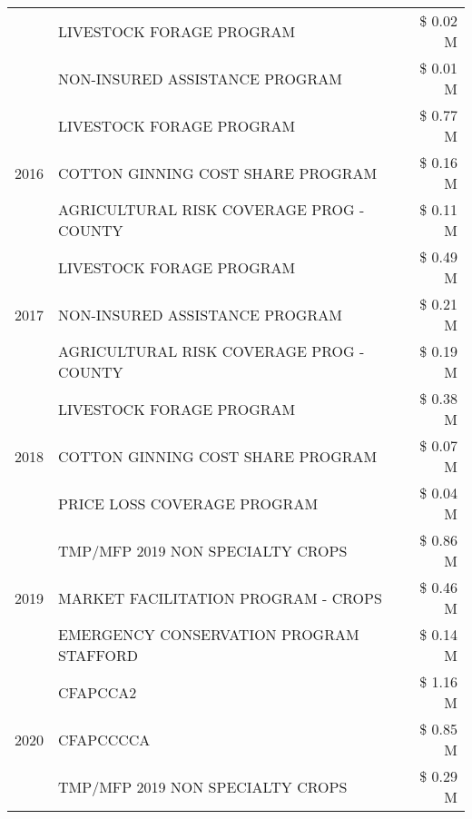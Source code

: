 \begin{tabular}{llr}
 & LIVESTOCK FORAGE PROGRAM & \$ 0.02 M \\
 & NON-INSURED ASSISTANCE PROGRAM & \$ 0.01 M \\
\cline{1-3}
\multirow[t]{3}{*}{2016} & LIVESTOCK FORAGE PROGRAM                      & \$ 0.77 M \\
 & COTTON GINNING COST SHARE PROGRAM             & \$ 0.16 M \\
 & AGRICULTURAL RISK COVERAGE PROG - COUNTY      & \$ 0.11 M \\
\cline{1-3}
\multirow[t]{3}{*}{2017} & LIVESTOCK FORAGE PROGRAM & \$ 0.49 M \\
 & NON-INSURED ASSISTANCE PROGRAM & \$ 0.21 M \\
 & AGRICULTURAL RISK COVERAGE PROG - COUNTY & \$ 0.19 M \\
\cline{1-3}
\multirow[t]{3}{*}{2018} & LIVESTOCK FORAGE PROGRAM & \$ 0.38 M \\
 & COTTON GINNING COST SHARE PROGRAM & \$ 0.07 M \\
 & PRICE LOSS COVERAGE PROGRAM & \$ 0.04 M \\
\cline{1-3}
\multirow[t]{3}{*}{2019} & TMP/MFP 2019 NON SPECIALTY CROPS & \$ 0.86 M \\
 & MARKET FACILITATION PROGRAM - CROPS & \$ 0.46 M \\
 & EMERGENCY CONSERVATION PROGRAM STAFFORD & \$ 0.14 M \\
\cline{1-3}
\multirow[t]{3}{*}{2020} & CFAPCCA2 & \$ 1.16 M \\
 & CFAPCCCCA & \$ 0.85 M \\
 & TMP/MFP 2019 NON SPECIALTY CROPS & \$ 0.29 M \\
\cline{1-3}
\bottomrule
\end{tabular}
